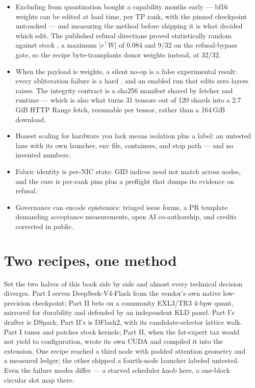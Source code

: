 \begin{itemize}
\item Excluding  from quantization bought a capability months
early --- bf16 weights can be edited at load time, per TP rank, with the
pinned checkpoint untouched --- and measuring the method before shipping it
is what decided which edit. The published refusal directions proved
statistically random against stock , a maximum
$\lvert r^{\top}W\rvert$ of $0.084$ and 9/32 on the refusal-bypass gate, so
the recipe byte-transplants donor weights instead, at 32/32.
\item When the payload is weights, a silent no-op is a false experimental
result: every abliteration failure is a hard , and an
enabled run that edits zero layers raises. The integrity contract is a
sha256 manifest shared by fetcher and runtime --- which is also what turns
31 tensors out of 120 shards into a 2.7\,GiB HTTP Range fetch, resumable
per tensor, rather than a 164\,GiB download.
\item Honest scaling for hardware you lack means isolation plus a label:
an untested lane with its own launcher, env file, containers, and stop
path --- and no invented numbers.
\item Fabric identity is per-NIC state: GID indices need not match across
nodes, and the cure is per-rank pins plus a preflight that dumps its
evidence on refusal.
\item Governance can encode epistemics: triaged issue forms, a PR template
demanding acceptance measurements, open AI co-authorship, and credits
corrected in public.
\end{itemize}

\section{Two recipes, one method}

Set the two halves of this book side by side and almost every technical
decision diverges. Part I serves DeepSeek-V4-Flash from the vendor's own
native low-precision checkpoint; Part II bets on a community EXL3/TR3
4-bpw quant, mirrored for durability and defended by an independent KLD
panel. Part I's drafter is DSpark; Part II's is DFlash2, with its
candidate-selector lattice walk. Part I tunes and patches stock kernels;
Part II, when the fat-expert tax would not yield to configuration, wrote
its own CUDA and compiled it into the extension. One recipe reached a
third node with padded attention geometry and a measured ledger; the other
shipped a fourth-node launcher labeled untested. Even the failure modes
differ --- a starved scheduler knob here, a one-block circular slot map
there.

